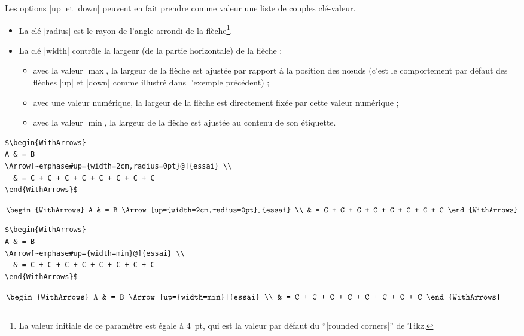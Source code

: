 \documentclass[dvipsnames]{article}%
\begin{document}
\begin{WithArrows}
\begin{WithArrows}[rr]
\vspace{1cm}
Les options |up| et |down| peuvent en fait prendre comme valeur une liste de couples clé-valeur. 
\begin{itemize}
\item La clé |radius| est le rayon de l'angle arrondi de la flèche\footnote{La valeur initiale de ce paramètre est égale à
$4$~pt, qui est la valeur par défaut du ``|rounded corners|'' de Tikz.}.
\item La clé |width| contrôle la largeur (de la partie horizontale) de la flèche :
\begin{itemize}
\item avec la valeur |max|, la largeur de la flèche est ajustée par rapport à la position des nœuds (c'est le
comportement par défaut des flèches |up| et |down| comme illustré dans l'exemple précédent) ;
\item avec une valeur numérique, la largeur de la flèche est directement fixée par cette valeur numérique ;
\item avec la valeur |min|, la largeur de la flèche est ajustée au contenu de son étiquette.
\end{itemize}
\end{itemize}

\vspace{1cm}
\begin{Verbatim}
$\begin{WithArrows}
A & = B 
\Arrow[~emphase#up={width=2cm,radius=0pt}@]{essai} \\
  & = C + C + C + C + C + C + C + C 
\end{WithArrows}$
\end{Verbatim}

\medskip
$\begin{WithArrows}
A & = B 
\Arrow[up={width=2cm,radius=0pt}]{essai} \\
  & = C + C + C + C + C + C + C + C 
\end{WithArrows}$


\vspace{1cm}
\begin{Verbatim}
$\begin{WithArrows}
A & = B 
\Arrow[~emphase#up={width=min}@]{essai} \\
  & = C + C + C + C + C + C + C + C 
\end{WithArrows}$
\end{Verbatim}

\medskip
$\begin{WithArrows}
A & = B 
\Arrow[up={width=min}]{essai} \\
  & = C + C + C + C + C + C + C + C 
\end{WithArrows}$


\end{WithArrows}
\end{WithArrows}
\end{document}
